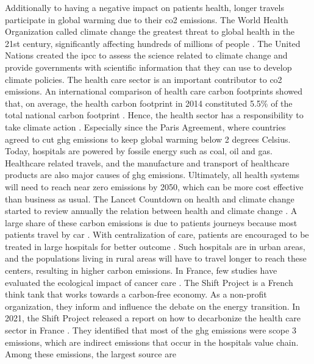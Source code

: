 Additionally to having a negative impact on patients health, longer travels
participate in global warming due to their \ac{co2} emissions.  The World Health
Organization called climate change the greatest threat to global health in the
21st century, significantly affecting hundreds of millions of people
\cite{change_climate_2015}. The United Nations created the \ac{ipcc} to assess
the science related to climate change and provide governments with scientific
information that they can use to develop climate policies. The health care
sector is an important contributor to \ac{co2} emissions. An international
comparison of health care carbon footprints showed that, on average, the health
carbon footprint in 2014 constituted 5.5\% of the total national carbon
footprint \cite{pichler_international_2019}. Hence, the health sector has a
responsibility to take climate action
\cite{health_care_without_harm_hcwh_global_2021}. Especially since the Paris
Agreement, where countries agreed to cut \ac{ghg} emissions to keep global
warming below 2 degrees Celsius. Today, hospitals are powered by fossile energy
such as coal, oil and gas. Healthcare related travels, and the manufacture and
transport of healthcare products are also major causes of \ac{ghg} emissions.
Ultimately, all health systems will need to reach near zero emissions by 2050,
which can be more cost effective than business as usual. The Lancet Countdown on
health and climate change started to review annually the relation between health
and climate change \cite{watts_2020_2021}. A large share of these carbon
emissions is due to patients journeys
\cite{andrews_carbon_2013,nicolet_what_2022} because most patients travel by car
\cite{forner_carbon_2021}. With centralization of care, patients are encouraged
to be treated in large hospitals for better outcome \cite{eskander_health_2016}.
Such hospitals are in urban areas, and the populations living in rural areas
will have to travel longer to reach these centers, resulting in higher carbon
emissions. In France, few studies have evaluated the ecological impact of cancer
care \cite{guillon_empreinte_2020}. The Shift Project is a French think tank
that works towards a carbon-free economy. As a non-profit organization, they
inform and influence the debate on the energy transition. In 2021, the Shift
Project released a report on how to decarbonize the health care sector in France
\cite{the_shift_project_plan_2021}. They identified that most of the \ac{ghg}
emissions were scope 3 emissions, which are indirect emissions that occur in the
hospitals value chain. Among these emissions, the largest source are

